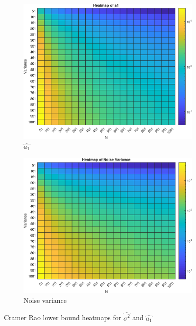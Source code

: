 \documentclass{article}
\begin{document}
\begin{figure}[h!]
\centering
\begin{subfigure}{0.33\textwidth}
\centering
\includegraphics[width = \textwidth]{heatmap_a1}
\caption{$\hat{a_1}$}
\label{fig:heatmap_a1}
\end{subfigure}
\begin{subfigure}{0.33\textwidth}
\centering
\includegraphics[width = \textwidth]{heatmap_noise}
\caption{Noise variance}
\label{fig:heatmap_noise}
\end{subfigure}
\caption{Cramer Rao lower bound heatmaps for $\hat{\sigma^2}$ and $\hat{a_1}$}
\label{fig:heatmap}
\end{figure}
\end{document}
